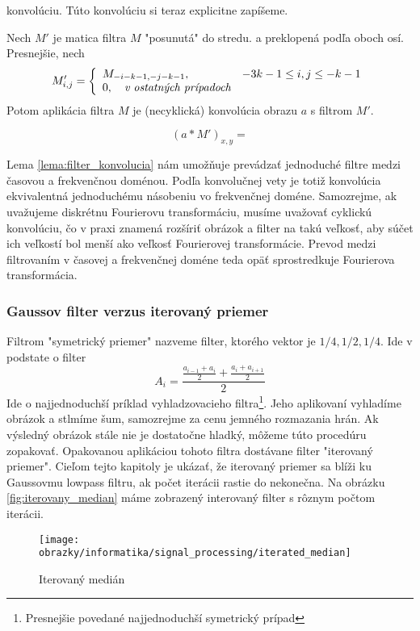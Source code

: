 konvolúciu. Túto konvolúciu si teraz explicitne zapíšeme.
\begin{lema}
    Nech $M'$ je matica filtra $M$ "posunutá" do stredu. a preklopená
    podľa oboch osí. Presnejšie, nech 
    \begin{equation}
        M'_{i,j} = \left\{
            \begin{array}{l l}
               M_{-i-k-1,-j-k-1}, \quad &  -3k-1 \le i,j \le -k-1 \\
               0, \quad \textit{v ostatných prípadoch}
            \end{array}
            \right.
    \end{equation}
    Potom aplikácia filtra $M$ je (necyklická) konvolúcia obrazu
    $a$ s filtrom $M'$.
    \label{lema:filter_konvolucia}
\end{lema}
\begin{dokaz}
    \begin{equation}
        (a * M')_{x,y} = 
    \end{equation}
\end{dokaz}
Lema \ref{lema:filter_konvolucia} nám umožňuje prevádzať jednoduché
filtre medzi časovou a frekvenčnou doménou. Podľa konvolučnej vety je
totiž konvolúcia ekvivalentná jednoduchému násobeniu vo frekvenčnej
doméne. Samozrejme, ak uvažujeme diskrétnu Fourierovu transformáciu,
musíme uvažovať cyklickú konvolúciu, čo v praxi znamená rozšíriť
obrázok a filter na takú veľkosť, aby súčet ich veľkostí bol menší ako
veľkosť Fourierovej transformácie. Prevod medzi filtrovaním v časovej
a frekvenčnej doméne teda opäť sprostredkuje Fourierova
transformácia.

\subsubsection{Gaussov filter verzus iterovaný priemer}

Filtrom "symetrický priemer" nazveme filter, ktorého vektor je $1/4,1/2,1/4$.
Ide v podstate o filter 
\begin{equation}
A_i = \frac{\frac{a_{i-1}+a_i}{2} + \frac{a_i + a_{i+1}}{2}}{2}
\end{equation}
Ide o najjednoduchší príklad vyhladzovacieho
filtra\footnote{Presnejšie povedané najjednoduchší symetrický prípad}.
Jeho aplikovaní vyhladíme obrázok a stlmíme šum, samozrejme za cenu
jemného rozmazania hrán. Ak výsledný obrázok stále nie je dostatočne
hladký, môžeme túto procedúru zopakovať.
Opakovanou aplikáciou tohoto filtra dostávane filter "iterovaný
priemer". Cieľom tejto kapitoly je ukázať, že iterovaný priemer sa
blíži ku Gaussovmu lowpass filtru, ak počet iterácii rastie do
nekonečna.
Na obrázku \ref{fig:iterovany_median} máme zobrazený interovaný filter
s rôznym počtom iterácii.
\begin{figure}[htp]
    \centering
    \texttt{[image: obrazky/informatika/signal\_processing/iterated\_median]}
    \caption{Iterovaný medián}
    \label{fig:iterated_median}
\end{figure}

